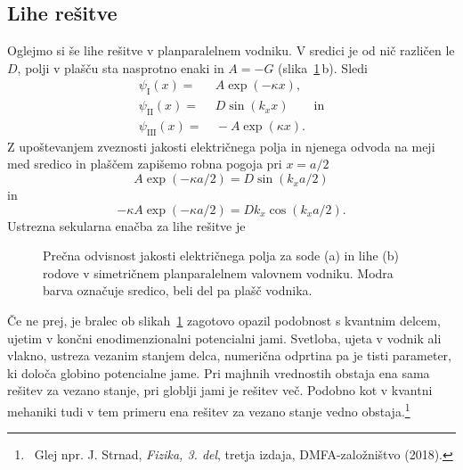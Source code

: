 \subsection*{Lihe rešitve}
Oglejmo si še lihe rešitve v planparalelnem vodniku. V sredici je od nič različen
le $D$, polji v plašču  sta nasprotno enaki in $A = -G$ (slika~\ref{fig:TESodi}\,b). Sledi
\begin{align}
\psi_{\mathrm{I}}(x) =&~ A \exp(-\kappa x),\\
\psi_{\mathrm{II}}(x) =&~ D \sin(k_x x) \qquad \mathrm{in}\\
\psi_{\mathrm{III}}(x) =&~ -A \exp(\kappa x).
\end{align}
Z upoštevanjem zveznosti jakosti električnega polja in njenega odvoda na 
meji med sredico in plaščem zapišemo robna pogoja pri $x=a/2$
\begin{equation}
A \exp(-\kappa a/2) = D \sin(k_x a/2)
\end{equation}
in 
\begin{equation}
-\kappa A \exp(-\kappa a/2) = D k_x \cos(k_x a/2).
\end{equation}
Ustrezna sekularna enačba za lihe rešitve je
\begin{figure}[ht]
\centering
\def\svgwidth{130truemm} 
 
\caption{Prečna odvisnost jakosti električnega polja za sode (a) in lihe (b) rodove v 
simetričnem planparalelnem valovnem vodniku. Modra barva označuje sredico, beli del 
pa plašč vodnika. 
}
\label{fig:TESodi}
\end{figure}
\begin{remark}
Če ne prej, je bralec ob slikah~\ref{fig:TESodi} zagotovo opazil podobnost s kvantnim 
delcem, ujetim v končni enodimenzionalni potencialni jami. Svetloba, ujeta v vodnik ali
vlakno, ustreza vezanim stanjem delca, numerična odprtina pa je tisti parameter, 
ki določa globino potencialne jame. Pri majhnih vrednostih obstaja ena sama rešitev 
za vezano stanje, pri globlji jami je rešitev več. Podobno kot v kvantni mehaniki
tudi v tem primeru ena rešitev za vezano stanje vedno obstaja.\footnote{~Glej npr.
J. Strnad, {\it Fizika, 3. del}, tretja izdaja, DMFA-založništvo (2018).} 
\end{remark}

